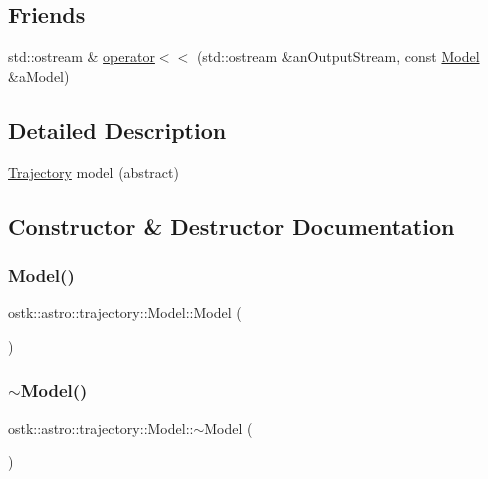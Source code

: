 \subsection*{Friends}
\begin{DoxyCompactItemize}
\item 
std\+::ostream \& \hyperlink{classostk_1_1astro_1_1trajectory_1_1_model_a68240493d08f91f6613186eb52823e85}{operator$<$$<$} (std\+::ostream \&an\+Output\+Stream, const \hyperlink{classostk_1_1astro_1_1trajectory_1_1_model}{Model} \&a\+Model)
\end{DoxyCompactItemize}


\subsection{Detailed Description}
\hyperlink{classostk_1_1astro_1_1_trajectory}{Trajectory} model (abstract) 

\subsection{Constructor \& Destructor Documentation}
\mbox{\label{classostk_1_1astro_1_1trajectory_1_1_model_aed4bcf4fbd44f69e97d8ff98112aa0f5}} 
\subsubsection{\texorpdfstring{Model()}{Model()}}
{\footnotesize\ttfamily ostk\+::astro\+::trajectory\+::\+Model\+::\+Model (\begin{DoxyParamCaption}{ }\end{DoxyParamCaption})}

\mbox{\label{classostk_1_1astro_1_1trajectory_1_1_model_a23acd7acccf729d8343180b83fe2f9f9}} 
\subsubsection{\texorpdfstring{$\sim$\+Model()}{~Model()}}
{\footnotesize\ttfamily ostk\+::astro\+::trajectory\+::\+Model\+::$\sim$\+Model (\begin{DoxyParamCaption}{ }\end{DoxyParamCaption})\hspace{0.3cm}{\ttfamily [pure virtual]}}



